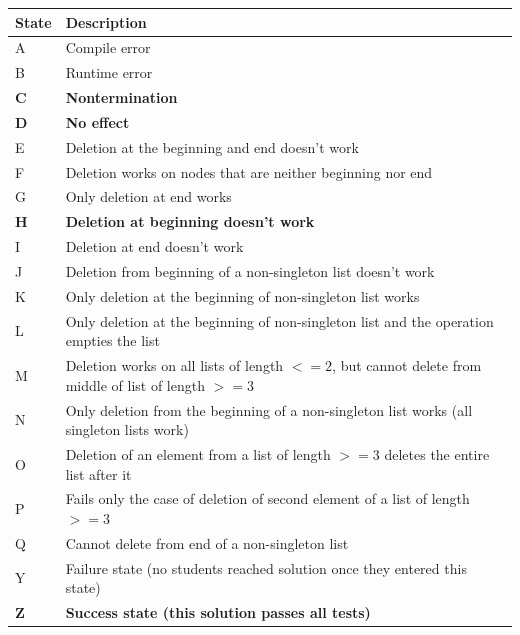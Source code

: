 \documentclass[11pt,letterpaper]{article}
\begin{document}
\begin{table}
\def\arraystretch{1.75}
\centering
\label{table:trans-states}
\begin{tabular}{|p{0.5in}|p{3in}|} \hline
 \textbf{State} & \textbf{Description}\\ \hline
A & Compile error\\ \hline

B & Runtime error\\ \hline

\textbf{C} & \textbf{Nontermination}\\ \hline

\textbf{D} & \textbf{No effect}\\ \hline

E & Deletion at the beginning and end doesn't work\\ \hline

F & Deletion works on nodes that are neither beginning nor end\\ \hline

G & Only deletion at end works\\ \hline

\textbf{H} & \textbf{Deletion at beginning doesn't work}\\ \hline

I & Deletion at end doesn't work\\ \hline

J & Deletion from beginning of a non-singleton list doesn't work\\ \hline

K & Only deletion at the beginning of non-singleton list works\\ \hline

L & Only deletion at the beginning of non-singleton list and the operation empties the list\\ \hline

M & Deletion works on all lists of length $<= 2$, but cannot delete from middle of list of length $>= 3$\\ \hline

N & Only deletion from the beginning of a non-singleton list works  (all singleton lists work)\\ \hline

O & Deletion of an element from a list of length $>=3$ deletes the entire list after it\\ \hline

P & Fails only the case of deletion of second element of a list of length $>= 3$\\ \hline

Q & Cannot delete from end of a non-singleton list\\ \hline

Y & Failure state (no students reached solution once they entered this state) \\ \hline

\textbf{Z} & \textbf{Success state (this solution passes all tests)}\\ \hline
\end{tabular}
\end{table}
\end{document}
